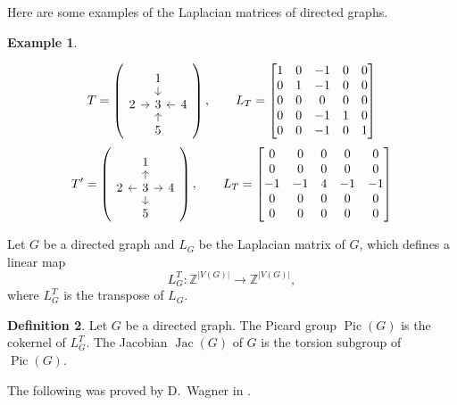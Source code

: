 \documentclass[11pt,reqno]{amsart}
\DeclareMathOperator{\Pic}{Pic}
\DeclareMathOperator{\Jac}{Jac}
\theoremstyle{definition}
\newtheorem{mydef}{Definition}[section]
\newtheorem{myeg}[mydef]{Example}
\theoremstyle{plain}
\begin{document}
Here are some examples of the Laplacian matrices of directed graphs.

\begin{myeg}\label{example: laplacian}

\begin{equation}
	T=\left(\begin{tikzcd}[row sep=0.25cm, column sep=0.25cm]
		& 1 \arrow[d] & \\
		2 \arrow[r]& 3 & 4 \arrow[l]\\
		& 5 \arrow[u] &
	\end{tikzcd} \right), \qquad L_T = \begin{bmatrix}
	1& 0& -1&0 &0 \\
	0 & 1 & -1 & 0 &0\\
	0& 0& 0& 0 &0\\
	0& 0&-1&1 & 0\\
	0& 0&-1&0 & 1
\end{bmatrix}
\end{equation}
\begin{equation}
	T'=\left(\begin{tikzcd}[row sep=0.25cm, column sep=0.25cm]
		& 1 & \\
		2 & 3 \arrow[u] \arrow[r]\arrow[l] \arrow[d]& 4 \\
		& 5  &
	\end{tikzcd} \right), \qquad L_T = \begin{bmatrix}
	0& 0& 0&0 &0 \\
	0 & 0 & 0 & 0 &0\\
	-1& -1& 4& -1 &-1\\
	0& 0&0&0 & 0\\
	0& 0&0&0 & 0
\end{bmatrix}
\end{equation}
\end{myeg}

Let $G$ be a directed graph and $L_G$ be the Laplacian matrix of $G$, which defines a linear map
\begin{equation}\label{eq: laplacian}
L_G^T:\mathbb{Z}^{|V(G)|} \to \mathbb{Z}^{|V(G)|},
\end{equation}
where $L_G^T$ is the transpose of $L_G$. 

\begin{mydef}
Let $G$ be a directed graph. The Picard group $\Pic(G)$ is the cokernel of $L_G^T$. The Jacobian $\Jac(G)$ of $G$ is the torsion subgroup of $\Pic(G)$. 
\end{mydef}

The following was proved by D.~Wagner in \cite{wagner2000critical}. 
\end{document}

